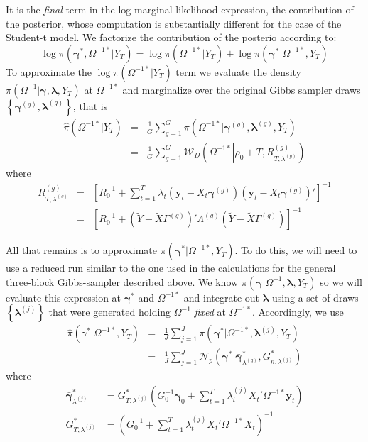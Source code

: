 \documentclass[12pt]{article}
\begin{document}
It is the \emph{final} term in the log marginal likelihood expression, the contribution of the posterior, whose computation is substantially different for the case of the Student-t model.
We factorize the contribution of the posterio according to:
\begin{equation*}
  \log \pi(\boldsymbol{\gamma}^*, \Omega^{-1*}|Y_T) =  \log \pi\left( \Omega^{-1*}|Y_T \right) + \log \pi\left( \boldsymbol{\gamma}^*|\Omega^{-1*},Y_T \right) 
\end{equation*}
To approximate the $\log \pi(\Omega^{-1*}|Y_T)$ term we evaluate the density $\pi(\Omega^{-1}|\boldsymbol{\gamma},\boldsymbol{\lambda},Y_T)$ at $\Omega^{-1*}$ and marginalize over the original Gibbs sampler draws $\left\{ \boldsymbol{\gamma}^{(g)}, \boldsymbol{\lambda}^{(g)} \right\}$, that is
\begin{eqnarray*}
  \widehat{\pi}\left( \Omega^{-1*}|Y_T \right) &=& \frac{1}{G}\sum_{g=1}^G \pi\left( \Omega^{-1*}|\boldsymbol{\gamma}^{(g)},\boldsymbol{\lambda}^{(g)},Y_T \right)\\
  &=& \frac{1}{G}\sum_{g=1}^G \mathcal{W}_D\left(\Omega^{-1*}\left|\rho_0 + T, R_{T,\lambda^{(g)}}^{\left( g \right)}\right. \right) 
\end{eqnarray*}
where
\begin{eqnarray*}
  R^{(g)}_{T,\lambda^{(g)}} &=&  \left[ R_0^{-1} + \sum_{t=1}^{T} \lambda_t \left( \mathbf{y}_t - X_t \boldsymbol{\gamma}^{(g)} \right)\left( \mathbf{y}_t - X_t \boldsymbol{\gamma}^{(g)} \right)' \right]^{-1}\\
  &=& \left[  R_0^{-1} + \left( \widetilde{Y} - \widetilde{X} \Gamma^{(g)} \right)' \Lambda^{(g)}\left( \widetilde{Y} - \widetilde{X} \Gamma^{(g)} \right)\right]^{-1}
\end{eqnarray*}

All that remains is to approximate $\pi\left( \boldsymbol{\gamma}^*|\Omega^{-1*}, Y_T \right)$.
To do this, we will need to use a reduced run similar to the one used in the calculations for the general three-block Gibbs-sampler described above.
We know $\pi\left( \boldsymbol{\gamma}|\Omega^{-1}, \boldsymbol{\lambda},Y_T \right)$ so we will evaluate this expression at $\boldsymbol{\gamma}^*$ and $\Omega^{-1*}$ and integrate out $\boldsymbol{\lambda}$ using a set of draws $\left\{ \boldsymbol{\lambda}^{(j)} \right\}$ that were generated holding $\Omega^{-1}$ \emph{fixed} at $\Omega^{-1*}$.
Accordingly, we use
\begin{eqnarray*}
  \widehat{\pi} (\gamma^*|\Omega ^{-1*},Y_T)&=& \frac{1}{J} \sum_{j=1}^{J}\pi\left( \boldsymbol{\gamma}^{*}|\Omega^{-1*}, \boldsymbol{\lambda}^{(j)},Y_T \right)\\
  &=& \frac{1}{J} \sum_{j=1}^{J}\mathcal{N}_{p}\left( \boldsymbol{\gamma}^*|\bar{\boldsymbol{\gamma}}_{\lambda ^{(g)}}^{\ast },G_{n,\lambda ^{(j)}}^* \right)
\end{eqnarray*}
where
\begin{align*}
  \bar{\boldsymbol{\gamma}}_{\lambda^{(j)}}^* &= G_{T,\lambda^{(j)}}^*\left(
  G_0^{-1}\boldsymbol{\gamma}_0 +\sum_{t=1}^{T}\lambda_{t}^{(j)}X_t'\Omega^{-1*}\mathbf{y}_t\right)  \\
G_{T,\lambda ^{(j)}}^* & =\left( G_{0}^{-1}+\sum_{t=1}^{T}\lambda
_{t}^{(j)}X_t'\Omega^{-1*}X_t\right) ^{-1}
\end{align*}
\end{document}
